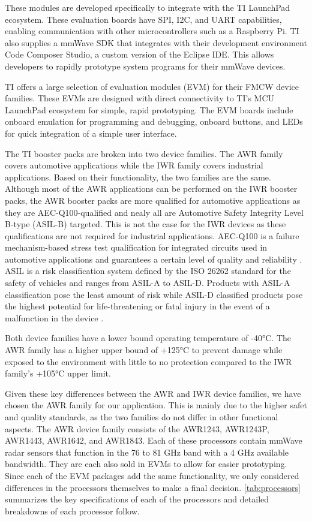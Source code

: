 \documentclass[11pt]{IEEEtran}
\begin{document}
			These modules are developed specifically to integrate with the TI LaunchPad ecosystem. These evaluation boards have SPI, I2C, and UART capabilities, enabling communication with other microcontrollers such as a Raspberry Pi. TI also supplies a mmWave SDK \cite{sdk} that integrates with their development environment Code Composer Studio, a custom version of the Eclipse IDE. This allows developers to rapidly prototype system programs for their mmWave devices.

			TI offers a large selection of evaluation modules (EVM) for their FMCW device families. These EVMs are designed with direct connectivity to TI's MCU LaunchPad ecosystem for simple, rapid prototyping. The EVM boards include onboard emulation for programming and debugging, onboard buttons, and LEDs for quick integration of a simple user interface.

			The TI booster packs are broken into two device families. The AWR family covers automotive applications \cite{awr} while the IWR family covers industrial applications. Based on their functionality, the two families are the same. Although most of the AWR applications can be performed on the IWR booster packs, the AWR booster packs are more qualified for automotive applications as they are AEC-Q100-qualified and nealy all are Automotive Safety Integrity Level B-type (ASIL-B) targeted. This is not the case for the IWR devices as these qualifications are not required for industrial applications. AEC-Q100 is a failure mechanism-based stress test qualification for integrated circuits used in automotive applications and guarantees a certain level of quality and reliability \cite{aecq100}. ASIL is a risk classification system defined by the ISO 26262 standard \cite{iso26262} for the safety of vehicles and ranges from ASIL-A to ASIL-D. Products with ASIL-A classification pose the least amount of risk while ASIL-D classified products pose the highest potential for life-threatening or fatal injury in the event of a malfunction in the device \cite{asil}. 

			Both device families have a lower bound operating temperature of \ang{-40}C. The AWR family has a higher upper bound of +\ang{125}C to prevent damage while exposed to the environment with little to no protection compared to the IWR family's +\ang{105}C upper limit. 

			Given these key differences between the AWR and IWR device families, we have chosen the AWR family for our application. This is mainly due to the higher safet and quality standards, as the two families do not differ in other functional aspects. The AWR device family consists of the AWR1243, AWR1243P, AWR1443, AWR1642, and AWR1843. Each of these processors contain mmWave radar sensors that function in the 76 to 81 GHz band with a 4 GHz available bandwidth. They are each also sold in EVMs to allow for easier prototyping. Since each of the EVM packages add the same functionality, we only considered differences in the processors themselves to make a final decision. \autoref{tab:processors} summarizes the key specifications of each of the processors and detailed breakdowns of each processor follow.
\end{document}
